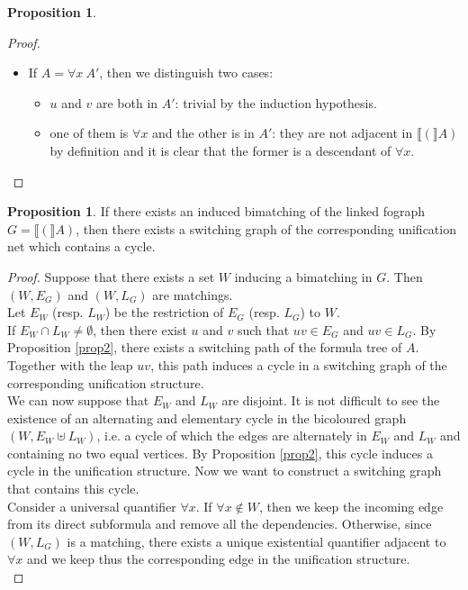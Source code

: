\documentclass[conference,twosided,10pt]{IEEEtran}
\theoremstyle{definition}
\newtheorem{proposition}[thm]{Proposition}
\newcommand{\graphof}[1]{\llbracket#1\rrbracket}
\begin{document}
\begin{proposition}
\begin{proof}
\begin{itemize}
\begin{itemize}
    \end{itemize}
  \item If $A = \forall x \ A'$, then we distinguish two cases:
    \begin{itemize}
      \item $u$ and $v$ are both in $A'$: trivial by the induction
	      hypothesis.
      \item one of them is $\forall x$ and the other is in $A'$:
	      they are not adjacent in $\graphof(A)$ by definition and it is clear that
		    the former is a descendant of $\forall x$.
    \end{itemize}
\end{itemize}
\end{proof}
\end{proposition}

\begin{proposition}
If there exists an induced bimatching of the linked fograph $G = \graphof(A)$, then there exists a switching graph of the corresponding unification net which contains a cycle.
\begin{proof}
  Suppose that there exists a set $W$ inducing a bimatching in $G$.
  Then $(W, E_G)$ and $(W, L_G)$ are matchings.\\
  Let $E_W$ (resp. $L_W$) be the restriction of $E_G$ (resp. $L_G$) to $W$. \\
  If $E_W \cap L_W \neq \emptyset$, then there exist $u$ and $v$ such that $uv
  \in E_G$ and $uv \in L_G$. By Proposition \ref{prop2}, there exists a
  switching path of the formula tree of $A$. Together with the leap
  $uv$, this path induces a cycle in a switching graph of the
  corresponding unification structure. \\
  We can now suppose that $E_W$ and $L_W$ are disjoint. It is not difficult to
  see the existence of an alternating and elementary cycle in the bicoloured graph $(W, E_W \uplus L_W)$, i.e. a cycle of which the edges are alternately in $E_W$ and $L_W$ and containing no two equal vertices.
  By Proposition \ref{prop2}, this cycle induces a cycle in the unification
  structure. Now we want to construct a switching graph that contains this cycle.\\
  Consider a universal quantifier $\forall x$. If $\forall x \notin W$, then        
  we keep the incoming edge from its direct subformula and remove all the 
  dependencies. Otherwise, since $(W, L_G)$ is a matching, there exists a
  unique existential quantifier adjacent to $\forall x$ and we keep thus the
  corresponding edge in the unification structure. \\

\end{proof}
\end{proposition}
\end{document}
